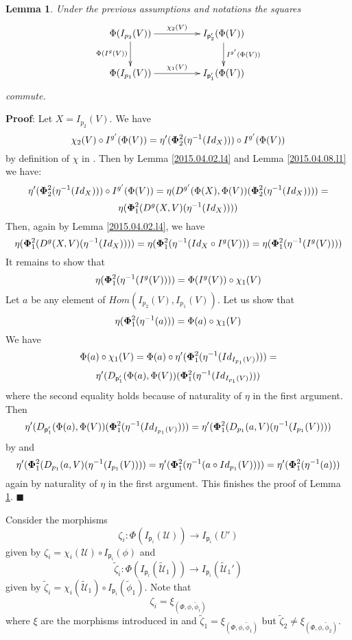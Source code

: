 \documentclass[12pt]{article}
\numberwithin{equation}{section}
\newenvironment{myproof}{{\bf Proof}:}{$\blacksquare$ \vskip 5mm }
\newtheorem{lemma}[proposition]{Lemma}
\newcommand{\llabel}[1]{\label{#1}}
\newcommand{\sr}{\rightarrow}
\newcommand{\wt}{\widetilde}
\newcommand{\p}{\mathsf{p}}
\newcommand{\U}{\mathcal{U}}
\begin{document}
%
\begin{lemma}
\llabel{2015.04.06.l7} Under the previous assumptions and notations the squares
%
$$
\begin{xy}
          \xymatrix@C=4pc{ \Phi(I_{p_2}(V)) \ar[r]^-{\chi_2(V)}
            \ar[d]_{\Phi(I^g(V))} & I_{\p_2'}(\Phi(V))
            \ar[d]^{I^{g'}(\Phi(V))}\\ \Phi(I_{p_1}(V)) \ar[r]^{\chi_1(V)} &
            I_{\p_1'}(\Phi(V)) }
\end{xy}
$$
%
commute.
\end{lemma}
%
\begin{myproof}
Let $X=I_{p_2}(V)$. We have
%
$$\chi_2(V)\circ {I^{g'}(\Phi(V))}=\eta'({\bf\Phi}_2^2(\eta^{-1}(Id_{X})))\circ
I^{g'}(\Phi(V))$$
%
by definition of $\chi$ in \cite[Construction 5.6]{fromunivwithPi}. Then by
Lemma \ref{2015.04.02.l4} and Lemma \ref{2015.04.08.l1} we have:
%
$$\eta'({\bf\Phi}_2^2(\eta^{-1}(Id_{X})))\circ
I^{g'}(\Phi(V))=\eta(D^{g'}(\Phi(X),\Phi(V))({\bf\Phi}_2^2(\eta^{-1}(Id_X))))=$$$$\eta({\bf\Phi}_1^2(D^g(X,V)(\eta^{-1}(Id_X))))$$
%
Then, again by Lemma \ref{2015.04.02.l4}, we have
%
$$\eta({\bf\Phi}_1^2(D^g(X,V)(\eta^{-1}(Id_X))))=\eta({\bf\Phi}_1^2(\eta^{-1}(Id_X\circ
I^g(V)))=\eta({\bf\Phi}_1^2(\eta^{-1}(I^g(V))))$$
%
It remains to show that
%
$$\eta({\bf\Phi}_1^2(\eta^{-1}(I^g(V))))=\Phi(I^g(V))\circ \chi_1(V)$$
%
Let $a$ be any element of $Hom(I_{p_2}(V),I_{p_1}(V))$. Let us show that
%
$$\eta({\bf\Phi}_1^2(\eta^{-1}(a)))=\Phi(a)\circ \chi_1(V)$$
%
We have
%
$$\Phi(a)\circ \chi_1(V)=\Phi(a)\circ
\eta'({\bf\Phi}^2_1(\eta^{-1}(Id_{I_{p_1}(V)})))=$$$$\eta'(D_{\p_1'}(\Phi(a),\Phi(V))({\bf\Phi}^2_1(\eta^{-1}(Id_{I_{p_1}(V)})))$$
%
where the second equality holds because of naturality of $\eta$ in the first
argument. Then
%
$$\eta'(D_{\p_1'}(\Phi(a),\Phi(V))({\bf\Phi}^2_1(\eta^{-1}(Id_{I_{p_1}(V)})))=\eta'({\bf\Phi}^2_1(D_{p_1}(a,V)(\eta^{-1}(I_{p_1}(V))))$$
%
by \cite[Lemma 5.4]{fromunivwithPi} and
%
$$\eta'({\bf\Phi}^2_1(D_{p_1}(a,V)(\eta^{-1}(I_{p_1}(V))))=\eta'({\bf\Phi}^2_1(\eta^{-1}(a\circ
Id_{p_1}(V))))=\eta'({\bf\Phi}_1^2(\eta^{-1}(a)))$$
%
again by naturality of $\eta$ in the first argument. This finishes the proof of
Lemma \ref{2015.04.06.l7}.
\end{myproof}




Consider the morphisms
%
$$\zeta_i:\Phi(I_{\p_i}(\U))\sr I_{\p_i}(U')$$
%
given by $\zeta_i=\chi_i(\U)\circ I_{\p_i}(\phi)$ and
%
$$\wt{\zeta}_i:\Phi(I_{\p_i}(\wt{\U}_1))\sr I_{\p_i}(\wt{\U}_1')$$
%
given by $\wt{\zeta}_i=\chi_i(\wt{\U}_1)\circ I_{\p_i}(\wt{\phi}_1)$. Note that
%
$$\zeta_i=\xi_{(\Phi,\phi,\wt{\phi}_i)}$$
%
where $\xi$ are the morphisms introduced in \cite{fromunivwithPi} and
$\wt{\zeta}_1=\xi_{(\Phi,\phi,\wt{\phi}_1)}$ but $\wt{\zeta}_2\ne
\xi_{(\Phi,\phi,\wt{\phi}_2)}$.
\end{document}
